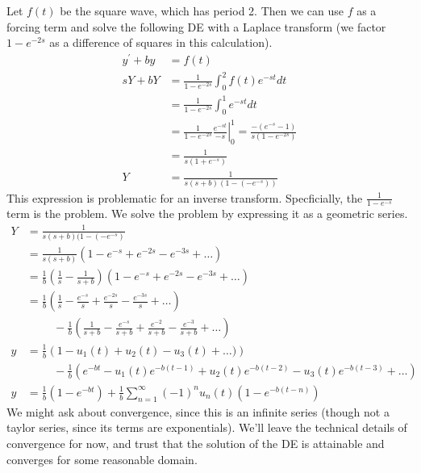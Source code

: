 \documentclass[fleqn,letterpaper]{report}
\begin{document}
\begin{example}
\label{example-square-wave}
Let $f(t)$ be the square wave, which has period
2. Then we can use $f$ as a forcing term and solve the
following DE with a Laplace transform (we factor $1-e^{-2s}$
as a difference of squares in this calculation).
\begin{align*}
y^\prime + by & = f(t) \\
sY + bY & = \frac{1}{1-e^{-2s}} \int_0^2 f(t) e^{-st} dt \\
& = \frac{1}{1-e^{-2s}} \int_0^1 e^{-st} dt \\
& = \frac{1}{1-e^{-2s}} \left. \frac{e^{-st}}{-s} \right|_0^1 =
\frac{-(e^{-s}-1)}{s(1-e^{-2s})} \\
& = \frac{1}{s(1+e^{-s})} \\
Y & = \frac{1}{s(s+b)(1-(-e^{-s}))}
\end{align*} 
This expression is problematic for an inverse transform.
Specficially, the $\frac{1}{1-e^{-s}}$ term is the problem. We
solve the problem by expressing it as a geometric series.
\begin{align*}
Y & = \frac{1}{s(s+b)(1-(-e^{-s})} \\
& = \frac{1}{s(s+b)} \left( 1 - e^{-s} + e^{-2s} - e^{-3s} +
\ldots \right) \\
& = \frac{1}{b} \left( \frac{1}{s} - \frac{1}{s +
b}\right) \left( 1 - e^{-s} + e^{-2s} - e^{-3s} +
\ldots \right) \\
& = \frac{1}{b} \left( \frac{1}{s} - \frac{e^{-s}}{s} +
\frac{e^{-2s}}{s} - \frac{e^{-3s}}{s} + \ldots \right) \\
& \hspace{1cm} - \frac{1}{b} \left( \frac{1}{s + b} -
\frac{e^{-s}}{s + b} + \frac{e^{-2}}{s + b}
- \frac{e^{-3}}{s + b} + \ldots \right) \\
y & = \frac{1}{b} \left( 1 - u_1(t) + u_2(t) - u_3(t) + \ldots)
\right) \\
& \hspace{1cm} - \frac{1}{b} \left( e^{-bt} - u_1(t)
e^{-b(t-1)} + u_2(t) e^{-b(t-2)} - u_3(t)
e^{-b(t-3)} + \ldots \right) \\
y & = \frac{1}{b} \left( 1-e^{-bt} \right) + \frac{1}{b}
\sum_{n=1}^\infty (-1)^n u_n(t) (1-e^{-b(t-n)}) 
\end{align*} 
We might ask about convergence, since this is an infinite
series (though not a taylor series, since its terms are
exponentials). We'll leave the technical details of
convergence for now, and trust that the solution of the DE is
attainable and converges for some reasonable domain.
\end{example}
\end{document}
